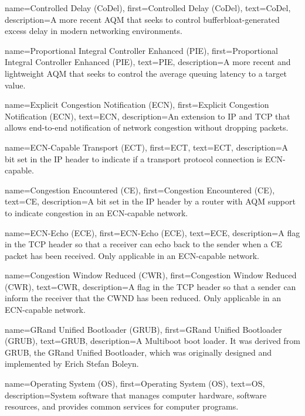 {
    name={Controlled Delay (CoDel)},
    first={Controlled Delay (CoDel)},
    text={CoDel},
    description={A more recent AQM that seeks to control bufferbloat-generated excess delay in modern
    networking environments.}
}

{
    name={Proportional Integral Controller Enhanced (PIE)},
    first={Proportional Integral Controller Enhanced (PIE)},
    text={PIE},
    description={A more recent and lightweight AQM that seeks to control the average queuing latency to a target value.}
}

{
    name={Explicit Congestion Notification (ECN)},
    first={Explicit Congestion Notification (ECN)},
    text={ECN},
    description={An extension to IP and TCP that allows end-to-end notification of network congestion without dropping packets.}
}

{
    name={ECN-Capable Transport (ECT)},
    first={ECT},
    text={ECT},
    description={A bit set in the IP header to indicate if a transport protocol connection is ECN-capable.}
}

{
    name={Congestion Encountered (CE)},
    first={Congestion Encountered (CE)},
    text={CE},
    description={A bit set in the IP header by a router with AQM support to indicate congestion in an ECN-capable network.}
}

{
    name={ECN-Echo (ECE)},
    first={ECN-Echo (ECE)},
    text={ECE},
    description={A flag in the TCP header so that a receiver can echo back to the sender when a CE packet has been received. Only applicable in an ECN-capable network.}
}

{
    name={Congestion Window Reduced (CWR)},
    first={Congestion Window Reduced (CWR)},
    text={CWR},
    description={A flag in the TCP header so that a sender can inform the receiver that the CWND has been reduced. Only applicable in an ECN-capable network.}
}

{
    name={GRand Unified Bootloader (GRUB)},
    first={GRand Unified Bootloader (GRUB)},
    text={GRUB},
    description={A Multiboot boot loader. It was derived from GRUB, the GRand Unified Bootloader, which was originally designed and implemented by Erich Stefan Boleyn.}
}

{
    name={Operating System (OS)},
    first={Operating System (OS)},
    text={OS},
    description={System software that manages computer hardware, software resources, and provides common services for computer programs.}
}

